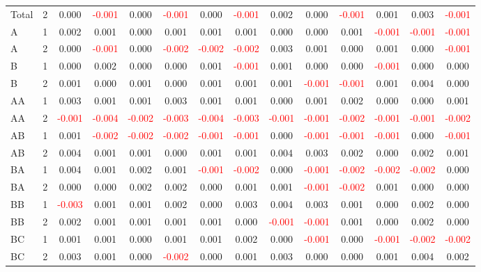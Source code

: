 \begin{table}[H]
{\begin{tabular}{llcccccccccccc}
Total & 2 & 0.000 & \textcolor{red}{-0.001} & 0.000 & \textcolor{red}{-0.001} & 0.000 & \textcolor{red}{-0.001} & 0.002 & 0.000 & \textcolor{red}{-0.001} & 0.001 & 0.003 & \textcolor{red}{-0.001}\\
A & 1 & 0.002 & 0.001 & 0.000 & 0.001 & 0.001 & 0.001 & 0.000 & 0.000 & 0.001 & \textcolor{red}{-0.001} & \textcolor{red}{-0.001} & \textcolor{red}{-0.001}\\
A & 2 & 0.000 & \textcolor{red}{-0.001} & 0.000 & \textcolor{red}{-0.002} & \textcolor{red}{-0.002} & \textcolor{red}{-0.002} & 0.003 & 0.001 & 0.000 & 0.001 & 0.000 & \textcolor{red}{-0.001}\\
B & 1 & 0.000 & 0.002 & 0.000 & 0.000 & 0.001 & \textcolor{red}{-0.001} & 0.001 & 0.000 & 0.000 & \textcolor{red}{-0.001} & 0.000 & 0.000\\
B & 2 & 0.001 & 0.000 & 0.001 & 0.000 & 0.001 & 0.001 & 0.001 & \textcolor{red}{-0.001} & \textcolor{red}{-0.001} & 0.001 & 0.004 & 0.000\\
AA & 1 & 0.003 & 0.001 & 0.001 & 0.003 & 0.001 & 0.001 & 0.000 & 0.001 & 0.002 & 0.000 & 0.000 & 0.001\\
AA & 2 & \textcolor{red}{-0.001} & \textcolor{red}{-0.004} & \textcolor{red}{-0.002} & \textcolor{red}{-0.003} & \textcolor{red}{-0.004} & \textcolor{red}{-0.003} & \textcolor{red}{-0.001} & \textcolor{red}{-0.001} & \textcolor{red}{-0.002} & \textcolor{red}{-0.001} & \textcolor{red}{-0.001} & \textcolor{red}{-0.002}\\
AB & 1 & 0.001 & \textcolor{red}{-0.002} & \textcolor{red}{-0.002} & \textcolor{red}{-0.002} & \textcolor{red}{-0.001} & \textcolor{red}{-0.001} & 0.000 & \textcolor{red}{-0.001} & \textcolor{red}{-0.001} & \textcolor{red}{-0.001} & 0.000 & \textcolor{red}{-0.001}\\
AB & 2 & 0.004 & 0.001 & 0.001 & 0.000 & 0.001 & 0.001 & 0.004 & 0.003 & 0.002 & 0.000 & 0.002 & 0.001\\
BA & 1 & 0.004 & 0.001 & 0.002 & 0.001 & \textcolor{red}{-0.001} & \textcolor{red}{-0.002} & 0.000 & \textcolor{red}{-0.001} & \textcolor{red}{-0.002} & \textcolor{red}{-0.002} & \textcolor{red}{-0.002} & 0.000\\
BA & 2 & 0.000 & 0.000 & 0.002 & 0.002 & 0.000 & 0.001 & 0.001 & \textcolor{red}{-0.001} & \textcolor{red}{-0.002} & 0.001 & 0.000 & 0.000\\
BB & 1 & \textcolor{red}{-0.003} & 0.001 & 0.001 & 0.002 & 0.000 & 0.003 & 0.004 & 0.003 & 0.001 & 0.000 & 0.002 & 0.000\\
BB & 2 & 0.002 & 0.001 & 0.001 & 0.001 & 0.001 & 0.000 & \textcolor{red}{-0.001} & \textcolor{red}{-0.001} & 0.001 & 0.000 & 0.002 & 0.000\\
BC & 1 & 0.001 & 0.001 & 0.000 & 0.001 & 0.001 & 0.002 & 0.000 & \textcolor{red}{-0.001} & 0.000 & \textcolor{red}{-0.001} & \textcolor{red}{-0.002} & \textcolor{red}{-0.002}\\
BC & 2 & 0.003 & 0.001 & 0.000 & \textcolor{red}{-0.002} & 0.000 & 0.001 & 0.003 & 0.000 & 0.000 & 0.001 & 0.004 & 0.002\\
\hline
    \end{tabular}%
    }
    \label{tab:cen9_uni}
\end{table}
